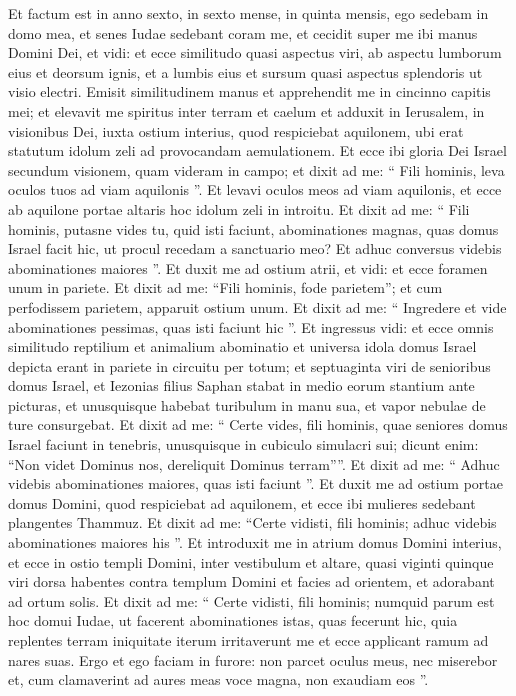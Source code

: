 \begin{biblechapter}
\begin{biblechapter}
\begin{biblechapter}
\begin{biblechapter}
\begin{biblechapter}
\begin{biblechapter}
\begin{biblechapter}
\begin{biblechapter}
\verse Et factum est in anno sexto, in sexto mense, in quinta mensis, ego sedebam in domo mea, et senes Iudae sedebant coram me, et cecidit super me ibi manus Domini Dei, 
\verse et vidi: et ecce similitudo quasi aspectus viri, ab aspectu lumborum eius et deorsum ignis, et a lumbis eius et sursum quasi aspectus splendoris ut visio electri. 
\verse Emisit similitudinem manus et apprehendit me in cincinno capitis mei; et elevavit me spiritus inter terram et caelum et adduxit in Ierusalem, in visionibus Dei, iuxta ostium interius, quod respiciebat aquilonem, ubi erat statutum idolum zeli ad provocandam aemulationem. 
\verse Et ecce ibi gloria Dei Israel secundum visionem, quam videram in campo; 
\verse et dixit ad me: “ Fili hominis, leva oculos tuos ad viam aquilonis ”. Et levavi oculos meos ad viam aquilonis, et ecce ab aquilone portae altaris hoc idolum zeli in introitu. 
\verse Et dixit ad me: “ Fili hominis, putasne vides tu, quid isti faciunt, abominationes magnas, quas domus Israel facit hic, ut procul recedam a sanctuario meo? Et adhuc conversus videbis abominationes maiores ”.
 \verse Et duxit me ad ostium atrii, et vidi: et ecce foramen unum in pariete. 
\verse Et dixit ad me: “Fili hominis, fode parietem”; et cum perfodissem parietem, apparuit ostium unum. 
\verse Et dixit ad me: “ Ingredere et vide abominationes pessimas, quas isti faciunt hic ”. 
\verse Et ingressus vidi: et ecce omnis similitudo reptilium et animalium abominatio et universa idola domus Israel depicta erant in pariete in circuitu per totum; 
\verse et septuaginta viri de senioribus domus Israel, et Iezonias filius Saphan stabat in medio eorum stantium ante picturas, et unusquisque habebat turibulum in manu sua, et vapor nebulae de ture consurgebat. 
\verse Et dixit ad me: “ Certe vides, fili hominis, quae seniores domus Israel faciunt in tenebris, unusquisque in cubiculo simulacri sui; dicunt enim: “Non videt Dominus nos, dereliquit Dominus terram””. 
\verse Et dixit ad me: “ Adhuc videbis abominationes maiores, quas isti faciunt ”.
 \verse Et duxit me ad ostium portae domus Domini, quod respiciebat ad aquilonem, et ecce ibi mulieres sedebant plangentes Thammuz. 
\verse Et dixit ad me: “Certe vidisti, fili hominis; adhuc videbis abominationes maiores his ”.
 \verse Et introduxit me in atrium domus Domini interius, et ecce in ostio templi Domini, inter vestibulum et altare, quasi viginti quinque viri dorsa habentes contra templum Domini et facies ad orientem, et adorabant ad ortum solis. 
\verse Et dixit ad me: “ Certe vidisti, fili hominis; numquid parum est hoc domui Iudae, ut facerent abominationes istas, quas fecerunt hic, quia replentes terram iniquitate iterum irritaverunt me et ecce applicant ramum ad nares suas. 
\verse Ergo et ego faciam in furore: non parcet oculus meus, nec miserebor et, cum clamaverint ad aures meas voce magna, non exaudiam eos ”.
 

\end{biblechapter}
\end{biblechapter}
\end{biblechapter}
\end{biblechapter}
\end{biblechapter}
\end{biblechapter}
\end{biblechapter}
\end{biblechapter}
